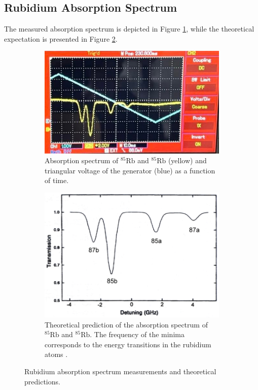 \subsection{Rubidium Absorption Spectrum}
The measured absorption spectrum is depicted in Figure \ref{fig:spectrum_1}, 
while the theoretical expectation is presented in Figure \ref{fig:spectrum_2}.
\begin{figure}
    \centering
    \begin{subfigure}{0.45\textwidth}
      \centering
      \includegraphics[width=\textwidth]{pictures/Spektrum.jpeg}
      \caption{Absorption spectrum of $^{85}\text{Rb}$ and $^{85}\text{Rb}$ (yellow) and triangular voltage of the generator (blue) as a function of time.}
      \label{fig:spectrum_1}
    \end{subfigure}
    \hfill
    \begin{subfigure}{0.45\textwidth}
      \centering
      \includegraphics[width=\textwidth]{pictures/Theoriespektrum.png}
      \caption{Theoretical prediction of the absorption spectrum of $^{85}\text{Rb}$ and $^{85}\text{Rb}$. The frequency of the minima corresponds to the energy transitions in the rubidium atoms \cite{satabs1}.}
      \label{fig:spectrum_2}
    \end{subfigure}
    \caption{Rubidium absorption spectrum measurements and theoretical predictions.}
    \label{fig:spectrum}
\end{figure}
